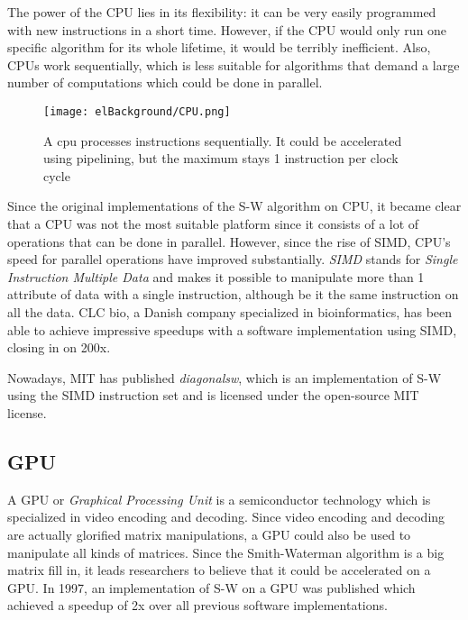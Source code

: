 The power of the CPU lies in its flexibility: it can be very easily programmed with new instructions in a short time. However, if the CPU would only run one specific algorithm for its whole lifetime, it would be terribly inefficient. Also, CPUs work sequentially, which is less suitable for algorithms that demand a large number of computations which could be done in parallel.

\begin{figure}[H]
	\centering
	\texttt{[image: elBackground/CPU.png]}
	\caption{A cpu processes instructions sequentially. It could be accelerated using pipelining, but the maximum stays 1 instruction per clock cycle}
	\label{fig:cpu}
\end{figure}

Since the original implementations of the S-W algorithm on CPU, it became clear that a CPU was not the most suitable platform since it consists of a lot of operations that can be done in parallel. However, since the rise of SIMD, CPU's speed for parallel operations have improved substantially. \emph{SIMD} stands for \emph{Single Instruction Multiple Data} and makes it possible to manipulate more than 1 attribute of data with a single instruction, although be it the same instruction on all the data. CLC bio, a Danish company specialized in bioinformatics, has been able to achieve impressive speedups with a software implementation using SIMD, closing in on 200x.

Nowadays, MIT has published \emph{diagonalsw}, which is an implementation of S-W using the SIMD instruction set and is licensed under the open-source MIT license.

\subsection{GPU}

A GPU or \emph{Graphical Processing Unit} is a semiconductor technology which is specialized in video encoding and decoding. Since video encoding and decoding are actually glorified matrix manipulations, a GPU could also be used to manipulate all kinds of matrices. Since the Smith-Waterman algorithm is a big matrix fill in, it leads researchers to believe that it could be accelerated on a GPU. In 1997, an implementation of S-W on a GPU was published %
which achieved a speedup of 2x over all previous software implementations.

